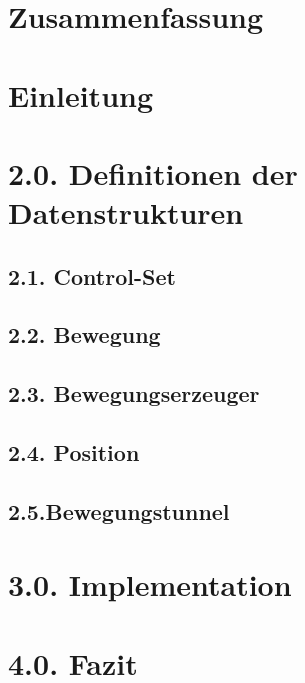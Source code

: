 \documentclass[11pt,a4paper,oneside]{article}
\begin{document}
\maketitle 
\pagebreak

\section{Zusammenfassung}


\section{Einleitung}

\pagebreak

\tableofcontents
\pagebreak

\section{2.0. Definitionen der Datenstrukturen}

\subsection{2.1. Control-Set}

\subsection{2.2. Bewegung}

\subsection{2.3. Bewegungserzeuger}

\subsection{2.4. Position}

\subsection{2.5.Bewegungstunnel}


\section{3.0. Implementation}


\section{4.0. Fazit}
\end{document}
